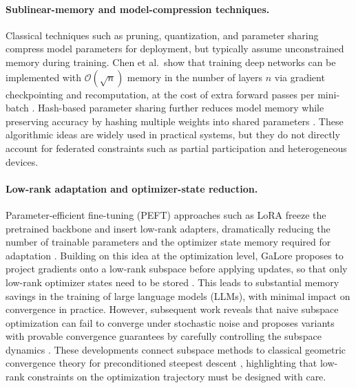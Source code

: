 \paragraph{Sublinear-memory and model-compression techniques.}
Classical techniques such as pruning, quantization, and parameter sharing compress model parameters for deployment, but typically assume unconstrained memory during training. Chen et al.\ show that training deep networks can be implemented with $\mathcal{O}(\sqrt{n})$ memory in the number of layers $n$ via gradient checkpointing and recomputation, at the cost of extra forward passes per mini-batch \cite{chen2016sublinear}. Hash-based parameter sharing further reduces model memory while preserving accuracy by hashing multiple weights into shared parameters \cite{chen2015hashing}. These algorithmic ideas are widely used in practical systems, but they do not directly account for federated constraints such as partial participation and heterogeneous devices.

\paragraph{Low-rank adaptation and optimizer-state reduction.}
Parameter-efficient fine-tuning (PEFT) approaches such as LoRA freeze the pretrained backbone and insert low-rank adapters, dramatically reducing the number of trainable parameters and the optimizer state memory required for adaptation \cite{hu2021lora}. Building on this idea at the optimization level, GaLore proposes to project gradients onto a low-rank subspace before applying updates, so that only low-rank optimizer states need to be stored \cite{zhao2024galore}. This leads to substantial memory savings in the training of large language models (LLMs), with minimal impact on convergence in practice. However, subsequent work reveals that naive subspace optimization can fail to converge under stochastic noise and proposes variants with provable convergence guarantees by carefully controlling the subspace dynamics \cite{he2024subspaceLLM}. These developments connect subspace methods to classical geometric convergence theory for preconditioned steepest descent \cite{neymeyr2011psd}, highlighting that low-rank constraints on the optimization trajectory must be designed with care.

